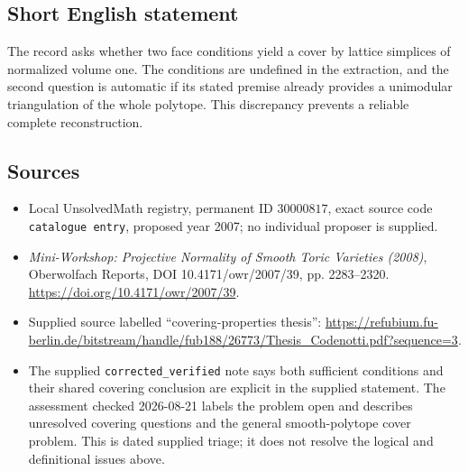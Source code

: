 \documentclass[11pt]{article}
\begin{document}
\subsection{Short English statement}
The record asks whether two face conditions yield a cover by lattice simplices of normalized volume one. The conditions are undefined in the extraction, and the second question is automatic if its stated premise already provides a unimodular triangulation of the whole polytope. This discrepancy prevents a reliable complete reconstruction.
\subsection{Sources}
\begin{itemize}
\item Local UnsolvedMath registry, permanent ID \(30000817\), exact source code \texttt{catalogue entry}, proposed year 2007; no individual proposer is supplied.
\item \emph{Mini-Workshop: Projective Normality of Smooth Toric Varieties (2008)}, Oberwolfach Reports, DOI 10.4171/owr/2007/39, pp. 2283--2320. \url{https://doi.org/10.4171/owr/2007/39}.
\item Supplied source labelled ``covering-properties thesis'': \url{https://refubium.fu-berlin.de/bitstream/handle/fub188/26773/Thesis_Codenotti.pdf?sequence=3}.
\item The supplied \texttt{corrected\_verified} note says both sufficient conditions and their shared covering conclusion are explicit in the supplied statement. The assessment checked 2026-08-21 labels the problem open and describes unresolved covering questions and the general smooth-polytope cover problem. This is dated supplied triage; it does not resolve the logical and definitional issues above.
\end{itemize}
\end{document}
